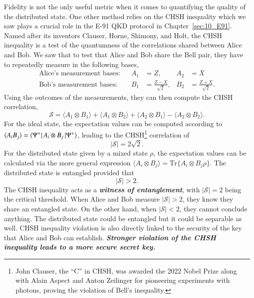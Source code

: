 Fidelity is not the only useful metric when it comes to quantifying the quality of the distributed state.
One other method relies on the CHSH inequality which we saw plays a crucial role in the E-91 QKD protocol in Chapter~\ref{sec:10_E91}.
Named after its inventors Clauser, Horne, Shimony, and Holt, the CHSH inequality is a test of the quantumness of the correlations shared between Alice and Bob.
We saw that to test that Alice and Bob share the \ket{\Psi^+} Bell pair, they have to repeatedly measure in the following bases,
\begin{align}
    \text{Alice's measurement bases:}& & A_1 & = Z, & A_2 & = X \\
    \text{Bob's measurement bases:}& & B_1 & = \frac{Z - X}{\sqrt{2}}, & B_2 & = \frac{Z + X}{\sqrt{2}}.
\end{align}
Using the outcomes of the measurements, they can then compute the CHSH correlation,
\begin{equation}
    \mathcal{S} = \langle A_1 \otimes B_1\rangle + \langle A_1 \otimes B_2\rangle + \langle A_2 \otimes B_1\rangle - \langle A_2 \otimes B_2\rangle.
    \label{eq:14-1_CHSH_Psi_plus}
\end{equation}
For the ideal state, the expectation values can be computed according to $\langle A_i B_j \rangle = \left\langle \Psi^+ \right| A_i \otimes B_j \left| \Psi^+ \right\rangle$, leading to the CHSH\footnote{John Clauser, the ``C'' in CHSH, was awarded the 2022 Nobel Prize along with Alain Aspect and Anton Zeilinger for pioneering experiments with photons, proving the violation of Bell's inequality.} correlation of
\begin{equation}
    \left| \mathcal{S} \right| = 2\sqrt{2}.
\end{equation}
For the distributed state given by a mixed state $\rho$, the expectation values can be calculated via the more general expression $\langle A_i \otimes B_j \rangle = \text{Tr} \{ A_i \otimes B_j \rho \}$.
The distributed state is entangled provided that
\begin{equation}
    \left| \mathcal{S} \right| > 2.
\end{equation}
The CHSH inequality acts as a \textbf{\emph{witness of entanglement}}, with $|\mathcal{S}| = 2$ being the critical threshold.
When Alice and Bob measure $|\mathcal{S}| > 2$, they know they share an entangled state.
On the other hand, when $|\mathcal{S}| < 2$, they cannot conclude anything. The distributed state could be entangled but it could be separable as well.
CHSH inequality violation is also directly linked to the security of the key that Alice and Bob can establish.
\textit{\textbf{Stronger violation of the CHSH inequality leads to a more secure secret key.}}

